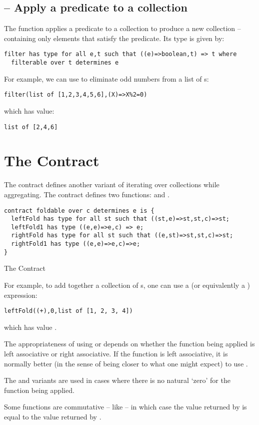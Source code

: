 \subsection{ -- Apply a predicate to a collection}
\label{filterFunction}

The  function applies a predicate to a collection to produce a new collection -- containing only elements that satisfy the predicate. Its type is given by:
\begin{lstlisting}
filter has type for all e,t such that ((e)=>boolean,t) => t where
  filterable over t determines e
\end{lstlisting}
For example, we can use  to eliminate odd numbers from a list of s:
\begin{lstlisting}
filter(list of [1,2,3,4,5,6],(X)=>X%2=0)
\end{lstlisting}
which has value:
\begin{lstlisting}
list of [2,4,6]
\end{lstlisting}

\section{The  Contract}
\label{foldableContract}
The  contract defines another variant of iterating over collections while aggregating. The  contract defines two functions:  and .

\begin{program}[H]
\begin{lstlisting}
contract foldable over c determines e is {
  leftFold has type for all st such that ((st,e)=>st,st,c)=>st;
  leftFold1 has type ((e,e)=>e,c) => e;
  rightFold has type for all st such that ((e,st)=>st,st,c)=>st;
  rightFold1 has type ((e,e)=>e,c)=>e;
}
\end{lstlisting}
\caption{The  Contract\label{foldableContractProg}}
\end{program}

For example, to add together a collection of s, one can use a  (or equivalently a ) expression:
\begin{lstlisting}
leftFold((+),0,list of [1, 2, 3, 4])
\end{lstlisting}
which has value .

\begin{aside}
The appropriateness of using  or  depends on whether the function being applied is left associative or right associative. If the function is left associative, it is normally better (in the sense of being closer to what one might expect) to use .

The  and  variants are used in cases where there is no natural `zero' for the function being applied.

Some functions are commutative -- like \q{(+)} -- in which case the value returned by  is equal to the value returned by .
\end{aside}

